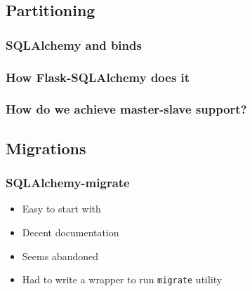 \documentclass[14pt]{beamer}
\begin{document}
\subsection{Partitioning}

\begin{frame}
  \frametitle{SQLAlchemy and binds}
\end{frame}

\begin{frame}
  \frametitle{How Flask-SQLAlchemy does it}
  
\end{frame}

\begin{frame}
  \frametitle{How do we achieve master-slave support?}
\end{frame}

\subsection{Migrations}

\begin{frame}
  \frametitle{SQLAlchemy-migrate}
  \begin{itemize}
  \item Easy to start with
  \item Decent documentation
  \item Seems abandoned
  \item Had to write a wrapper to run \texttt{migrate} utility
  \end{itemize}
\end{frame}
\end{document}
